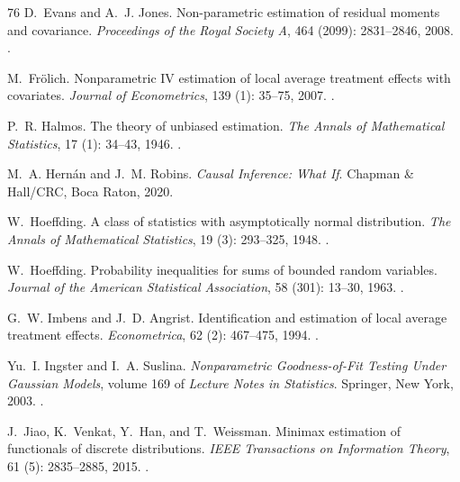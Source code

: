 \documentclass[12pt,oneside,openany]{book}
\numberwithin{equation}{chapter}
\theoremstyle{plain}
\theoremstyle{definition}
\theoremstyle{remark}
\begin{document}
\begin{thebibliography}{76}
D.~Evans and A.~J. Jones.
\newblock Non-parametric estimation of residual moments and covariance.
\newblock \emph{Proceedings of the Royal Society A}, 464
  (2099): 2831--2846, 2008.
\newblock {}.

M.~Fr{\"o}lich.
\newblock Nonparametric {IV} estimation of local average treatment effects with
  covariates.
\newblock \emph{Journal of Econometrics}, 139 (1): 35--75,
  2007.
\newblock {}.

P.~R. Halmos.
\newblock The theory of unbiased estimation.
\newblock \emph{The Annals of Mathematical Statistics}, 17
  (1): 34--43, 1946.
\newblock {}.

M.~A. Hern{\'a}n and J.~M. Robins.
\newblock \emph{Causal Inference: What If}.
\newblock Chapman \& Hall/CRC, Boca Raton, 2020.

W.~Hoeffding.
\newblock A class of statistics with asymptotically normal distribution.
\newblock \emph{The Annals of Mathematical Statistics}, 19
  (3): 293--325, 1948.
\newblock {}.

W.~Hoeffding.
\newblock Probability inequalities for sums of bounded random variables.
\newblock \emph{Journal of the American Statistical Association}, 58
  (301): 13--30, 1963.
\newblock {}.

G.~W. Imbens and J.~D. Angrist.
\newblock Identification and estimation of local average treatment effects.
\newblock \emph{Econometrica}, 62 (2): 467--475, 1994.
\newblock {}.

Yu.~I. Ingster and I.~A. Suslina.
\newblock \emph{Nonparametric Goodness-of-Fit Testing Under {Gaussian} Models},
  volume 169 of \emph{Lecture Notes in Statistics}.
\newblock Springer, New York, 2003.
\newblock {}.

J.~Jiao, K.~Venkat, Y.~Han, and T.~Weissman.
\newblock Minimax estimation of functionals of discrete distributions.
\newblock \emph{IEEE Transactions on Information Theory}, 61
  (5): 2835--2885, 2015.
\newblock {}.


\end{thebibliography}
\end{document}
